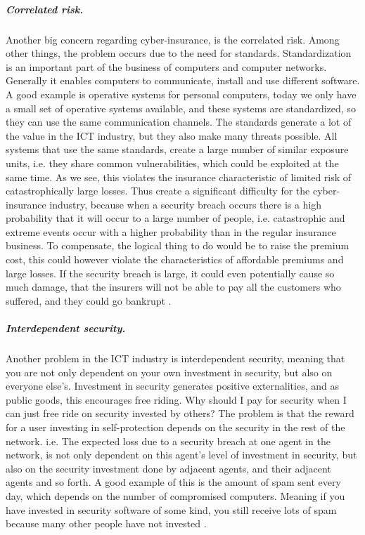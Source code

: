       
\subparagraph{Correlated risk.}

Another big concern regarding cyber-insurance, is the correlated risk. Among other things, the problem occurs due to the need for standards. Standardization is an important part of the business of computers and computer networks. Generally it enables computers to communicate, install and use different software. A good example is operative systems for personal computers, today we only have a small set of operative systems available, and these systems are standardized, so they can use the same communication channels. The standards generate a lot of the value in the ICT industry, but they also make many threats possible. All systems that use the same standards, create a large number of similar exposure units, i.e. they share common vulnerabilities, which could be exploited at the same time. As we see, this violates the insurance characteristic of limited risk of catastrophically large losses.  
Thus create a significant difficulty for the cyber-insurance industry, because when a security breach occurs there is a high probability that it will occur to a large number of people, i.e. catastrophic and extreme events occur with a higher probability than in the regular insurance business. To compensate, the logical thing to do would be to raise the premium cost, this could however violate the characteristics of affordable premiums and large losses. 
If the security breach is large, it could even potentially cause so much damage, that the insurers will not be able to pay all the customers who suffered, and they could go bankrupt \cite{bohme2010modeling}.


\subparagraph{Interdependent security.}
Another problem in the ICT industry is interdependent security, meaning that you are not only dependent on your own investment in security, but also on everyone else's. 
Investment in security generates positive externalities, and as public goods, this encourages free riding. Why should I pay for security when I can just free ride on security invested by others? The problem is that the reward for a user investing in self-protection depends on the security in the rest of the network. i.e. The expected loss due to a security breach at one agent in the network, is not only dependent on this agent's level of investment in security, but also on the security investment done by adjacent agents, and their adjacent agents and so forth. A good example of this is the amount of spam sent every day, which depends on the number of compromised computers. Meaning if you have invested in security software of some kind, you still receive lots of spam because many other people have not invested \cite{towardsInsurable}.
 
